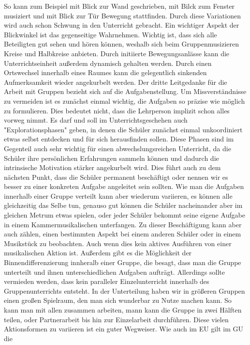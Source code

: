 So kann zum Beispiel mit Blick zur Wand geschrieben, mit Bilck zum Fenster
musiziert und mit Blick zur Tür Bewegung stattfinden. Durch diese Variationen
wird auch schon Schwung in den Unterricht gebracht. Ein wichtiger Aspekt der
Blickwinkel ist das gegenseitige Wahrnehmen. Wichtig ist, dass sich alle
Beteiligten gut sehen und hören können, weshalb sich beim Gruppenmusizieren
Kreise und Halbkreise anbieten. Durch initiierte Bewegungsanlässe kann die
Unterrichtseinheit außerdem dynamisch gehalten werden. Durch einen Ortswechsel
innerhalb eines Raumes kann die gelegentlich sinkenden Aufmerksamkeit wieder
angekurbelt werden. Der dritte Leitgedanke für die Arbeit mit Gruppen bezieht
sich auf die Aufgabenstellung. Um Missverständnisse zu vermeiden ist es zunächst
einmal wichtig, die Aufgaben so präzise wie möglich zu formulieren. Dies
bedeutet nicht, dass die Lehrperson implizit schon alles vorweg nimmt. Es darf
und soll im Unterrichtsgeschehen auch "Explorationsphasen" geben, in denen die
Schüler zunächst einmal unkoordiniert etwas selbst entdecken und für sich
herausfinden sollen. Diese Phasen sind im Gegenteil auch sehr wichtig für einen
abwechslungsreichen Unterricht, da die Schüler ihre persönlichen Erfahrungen
sammeln können und dadurch die intrinsische Motivation stärker angekurbelt wird.
Dies führt auch zu dem nächsten Punkt, dass die Schüler permanent beschäftigt
oder nennen wir es besser zu einer konkreten Aufgabe angeleitet sein sollten.
Wie man die Aufgaben innerhalb einer Gruppe verteilt kann aber wiederum
variieren, es können alle gleichzeitig das Selbe tun, genauso gut können die
Schüler nacheinander aber im gleichen Metrum etwas spielen, oder jeder Schüler
bekommt seine eigene Aufgabe in einem Kammermusikalischen unterfangen. Zu dieser
Beschäftigung kann aber auch zählen, einen bestimmten Aspekt bei einem anderen
Schüler oder in einem Musikstück zu beobachten. Auch wenn dies kein aktives
Ausführen von einer musikalischen Aktion ist. Außerdem gibt es die Möglichkeit
der Binnendifferenzierung innheralb einer Gruppe, die besagt, dass man die
Gruppe unterteilt und ihnen unterschiedlichen Aufgaben aufträgt. Allerdings
sollte vermieden werden, dass kein paralleler Einzelunterricht innerhalb des
Gruppenunterrichts entsteht. In der Unterteilung haben wir in größeren Gruppen
einen großen Spielraum, den man sich wunderbar zu Nutze machen kann. So kann man
mit allen zusammen arbeiten, mann kann die Gruppe in zwei Hälften teilen, oder
Partnerarbeit bis hin zur Einzelarbeit durchführen. Diese vielen Aktionsformen
zu variieren ist ein guter Wegweiser. Wie auch im EU gilt im GU die
